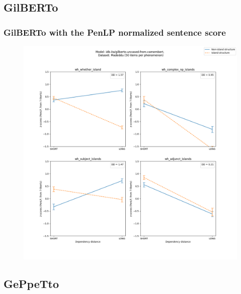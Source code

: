 \clearpage
\subsection{GilBERTo}
\subsubsection{GilBERTo with the PenLP normalized sentence score}
\begin{figure}[h]
	\centering
	\includegraphics[width=1\textwidth]{images/AppendixA/Madeddu_wh_idb-ita_gilberto-uncased-from-camembert_PenLP-zscores-likert-2022-09-16_h10m26s47.png} 
	\label{A-fig:md_gilberto_penlp}
	\caption{}
\end{figure}

\clearpage
\subsection{GePpeTto}
